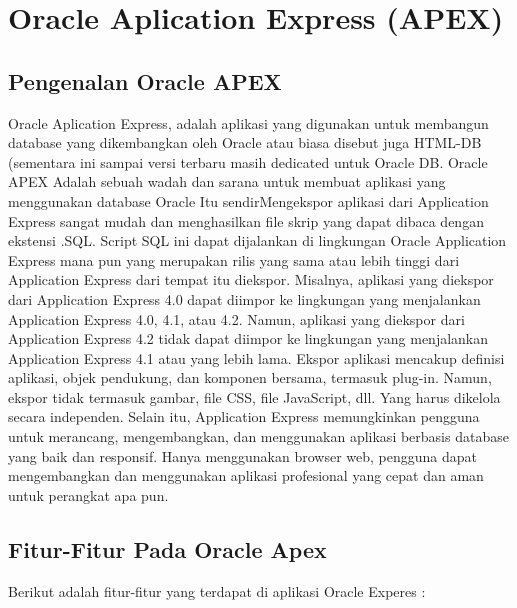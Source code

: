 \chapter{Oracle Aplication Express (APEX) }

\section{Pengenalan Oracle APEX}
Oracle Aplication Express\cite{OracleApex}, adalah aplikasi yang digunakan untuk membangun database yang dikembangkan oleh Oracle atau biasa disebut juga HTML-DB (sementara ini sampai versi terbaru masih dedicated untuk Oracle DB. Oracle APEX Adalah sebuah wadah dan sarana untuk membuat aplikasi yang menggunakan database Oracle Itu sendirMengekspor aplikasi dari Application Express sangat mudah dan menghasilkan file skrip yang dapat dibaca dengan ekstensi .SQL. Script SQL ini dapat dijalankan di lingkungan Oracle Application Express mana pun yang merupakan rilis yang sama atau lebih tinggi dari Application Express dari tempat itu diekspor. Misalnya, aplikasi yang diekspor dari Application Express 4.0 dapat diimpor ke lingkungan yang menjalankan Application Express 4.0, 4.1, atau 4.2. Namun, aplikasi yang diekspor dari Application Express 4.2 tidak dapat diimpor ke lingkungan yang menjalankan Application Express 4.1 atau yang lebih lama. Ekspor aplikasi mencakup definisi aplikasi, objek pendukung, dan komponen bersama, termasuk plug-in. Namun, ekspor tidak termasuk gambar, file CSS, file JavaScript, dll. Yang harus dikelola secara independen. Selain itu, Application Express memungkinkan pengguna untuk merancang, mengembangkan, dan menggunakan aplikasi berbasis database yang baik dan responsif. Hanya menggunakan browser web, pengguna dapat mengembangkan dan menggunakan aplikasi profesional yang cepat dan aman untuk perangkat apa pun.

\section{Fitur-Fitur Pada Oracle Apex}
Berikut adalah fitur-fitur yang terdapat di aplikasi Oracle Experes :

